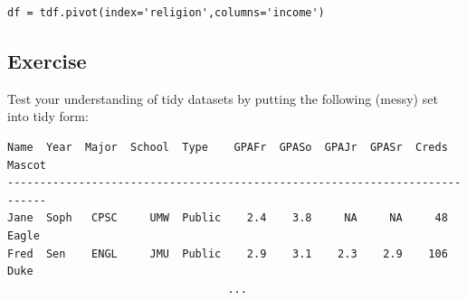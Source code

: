 \documentclass[12pt]{article}
\begin{document}
\begin{Verbatim}[fontsize=\small,samepage=true,frame=none]
df = tdf.pivot(index='religion',columns='income')
\end{Verbatim}

\vspace{.1in}
\subsection{Exercise}

Test your understanding of tidy datasets by putting the following (messy) set
into tidy form:

\small
\begin{Verbatim}[fontsize=\small,samepage=true,frame=none]
Name  Year  Major  School  Type    GPAFr  GPASo  GPAJr  GPASr  Creds  Mascot
----------------------------------------------------------------------------
Jane  Soph   CPSC     UMW  Public    2.4    3.8     NA     NA     48   Eagle
Fred  Sen    ENGL     JMU  Public    2.9    3.1    2.3    2.9    106   Duke 
                                  ...
\end{Verbatim}
\normalsize

%
%
%
%
%
%
%
% 
\end{document}
